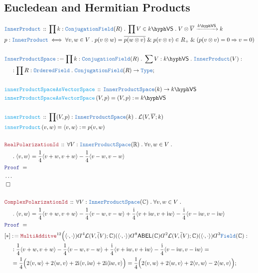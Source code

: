 \documentclass[12pt]{scrartcl}%
\newcommand{\TYPE}[1]{\textcolor{NavyBlue}{\mathtt{#1}}}%
\newcommand{\FUNC}[1]{\textcolor{Cerulean}{\mathtt{#1}}}%
\newcommand{\LOGIC}[1]{\textcolor{Blue}{\mathtt{#1}}}%
\newcommand{\THM}[1]{\textcolor{Maroon}{\mathtt{#1}}}%
\renewcommand{\.}{\; . \;} %
\newcommand{\de}{: \kern 0.1pc =} %
\newcommand{\Act}[1]{\left( #1 \right)} %
\newcommand{\Theorem}[2]{& \THM{#1} \, :: \, #2 \\ & \Proof = \\ } %
\newcommand{\DeclareType}[2]{& \TYPE{#1} \, :: \, #2 \\}%
\newcommand{\DefineType}[3]{& #1 : \TYPE{#2} \iff #3 \\}%
\newcommand{\DeclareFunc}[2]{& \FUNC{#1} \, :: \, #2 \\}%
\newcommand{\DefineNamedFunc}[4]{&  \FUNC{#1}\Act{#2} = #3 \de #4 \\}%
\newcommand{\NewLine}{\\ & \kern 1pc}%
\newcommand{\Page}[1]{ \begin{align*} #1 \end{align*}  }%
\newcommand{ \bd }{ \ByDef }%
\newcommand{\NoProof}{ & \ldots \\ \EndProof}%
\renewcommand{\And}{\; \& \;}%
\newcommand{\Type}{\TYPE{Type}}%
\newcommand{\Reals}{\mathbb{R}}%
\newcommand{\Complex}{\mathbb{C}}%
\newcommand{\Conclude}[3]{& #1 \de #2 : #3; \\}%
\newcommand{\QED}{\; \square} %
\newcommand{\EndProof}{& \QED \\} %
\newcommand{\ByDef}{\rotatebox[origin=c]{-180}{$D$}}%
\newcommand{\Proof}{\LOGIC{Proof} \; } %
\newcommand{\Arrow}[1]{\xrightarrow{#1}}%
\newcommand{\ABEL}{\mathsf{ABEL}} %
\newcommand{\IPS}{\TYPE{InnerProductSpace}}
\newcommand{\VS}[1]{#1\hyph\mathsf{VS}} %
\renewcommand{\L}{\mathcal{L}}
\begin{document}
\subsection{Eucledean and Hermitian Products}
\Page{
	\DeclareType{InnerProduct}
	{
		\prod k :\TYPE{ConjugationField}(R) \.
		\prod V \in \VS{k} \.
		V \otimes \overline{V} \Arrow{\VS{k}} k                    
	}
	\DefineType{p}{InnerProduct}{\forall v,w \in V \. p(v \otimes w) = \overline{p(w \otimes v)} \And p(v \otimes v) \in R_+ \And (p(v \otimes v) = 0 \Rightarrow v = 0)}
	\\
	\Conclude{\IPS}{\prod k : \TYPE{ConjugationField}(R) \. \sum V : \VS{k} \. \TYPE{InnerProduct}(V)}{ 
		\NewLine : \prod R : \TYPE{OrderedField} \. \TYPE{ConjugationField}(R) \to \Type}
	\\
	\DeclareFunc{innerProductSpaceAsVectorSpace}{ \IPS(k) \to \VS{k}}
	\DefineNamedFunc{innerProductSpaceAsVectorSpace}{V,p}{(V,p)}{\VS{k}} 
	\\
	\DeclareFunc{innerProduct}{ \prod (V,p) : \IPS(k) \. \L(V,\overline{V};k)}
	\DefineNamedFunc{innerProduct}{v,w}{\langle v, w \rangle}{p(v,w)} 
	\\
	\Theorem{RealPolarizationId}{\forall V : \IPS(\Reals) \. \forall v,w \in V \. \NewLine \.  
		\langle v, w \rangle =  \frac{1}{4}\langle v + w, v + w \rangle - \frac{1}{4}\langle v - w, v - w \rangle  
	} 
	\NoProof
	\\
	\Theorem{ComplexPolarizationId}{ 
		\forall V : \IPS(\Complex) \. \forall v,w \in V \. \NewLine \.
		\langle v,w \rangle =
			\frac{1}{4}\langle v + w, v + w \rangle - \frac{1}{4}\langle v - w, v - w \rangle  + 
			\frac{\mathrm{i}}{4}\langle v + \mathrm{i}w, v + \mathrm{i}w \rangle - \frac{\mathrm{i}}{4}\langle v - \mathrm{i}w, v - \mathrm{i}w \rangle 	
	}
	\Conclude{[*]}{\THM{MultiAdditve}^{12}\Big(\langle \cdot,\cdot\rangle)\bd^4 \L(V,\overline(V);\Complex)(\langle \cdot,\cdot\rangle) 
		\bd^8 \ABEL(\Complex)\bd^2 \L(V,\overline(V);\Complex)(\langle \cdot,\cdot\rangle) \bd^3 \TYPE{Field}(\Complex)}
	{
		\NewLine :
			\frac{1}{4}\langle v + w, v + w \rangle - \frac{1}{4}\langle v - w, v - w \rangle  + 
			\frac{\mathrm{i}}{4}\langle v + \mathrm{i}w, v + \mathrm{i}w \rangle - \frac{\mathrm{i}}{4}\langle v - \mathrm{i}w, v - \mathrm{i}w \rangle 	
		= \NewLine =
			\frac{1}{4}\Big(   2\langle v, w \rangle + 2\langle w,v \rangle	+ 
			2\mathrm{i}\langle v, \mathrm{i} w \rangle  + 2\mathrm{i}\langle \mathrm{i}w, v \rangle \Big)
		=
			\frac{1}{4}\Big(   2\langle v, w \rangle + 2\langle w,v \rangle	+ 
			2\langle v,  w \rangle  - 2\langle w, v \rangle \Big)
}}
\end{document}
